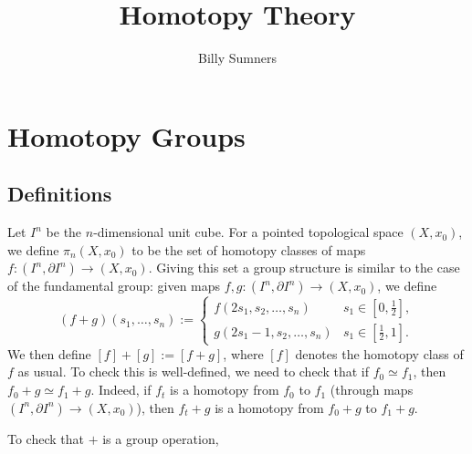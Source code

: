 \documentclass{book}
\title{Homotopy Theory}
\author{Billy Sumners}
\theoremstyle{definition}
\theoremstyle{remark}
\numberwithin{equation}{section}
\begin{document}
\maketitle 

\chapter{Homotopy Groups}
\section{Definitions}
Let $I^n$ be the $n$-dimensional unit cube. For a pointed topological space $(X, x_0)$, we define $\pi_n(X, x_0)$ to be the set of homotopy classes of maps $f \colon (I^n, \partial I^n) \to (X, x_0)$. Giving this set a group structure is similar to the case of the fundamental group: given maps $f, g \colon (I^n, \partial I^n) \to (X, x_0)$, we define 
\begin{equation}
    (f + g)(s_1, \dots, s_n) := 
    \begin{cases}
        f(2s_1, s_2, \dots, s_n)     & s_1 \in [0, \frac{1}{2}], \\
        g(2s_1 - 1, s_2, \dots, s_n) & s_1 \in [\frac{1}{2}, 1].
    \end{cases}
\end{equation}
We then define $[f] + [g] := [f + g]$, where $[f]$ denotes the homotopy class of $f$ as usual. To check this is well-defined, we need to check that if $f_0 \simeq f_1$, then $f_0 + g \simeq f_1 + g$. Indeed, if $f_t$ is a homotopy from $f_0$ to $f_1$ (through maps $(I^n, \partial I^n) \to (X, x_0)$), then $f_t + g$ is a homotopy from $f_0 + g$ to $f_1 + g$.

To check that $+$ is a group operation,
\end{document}
